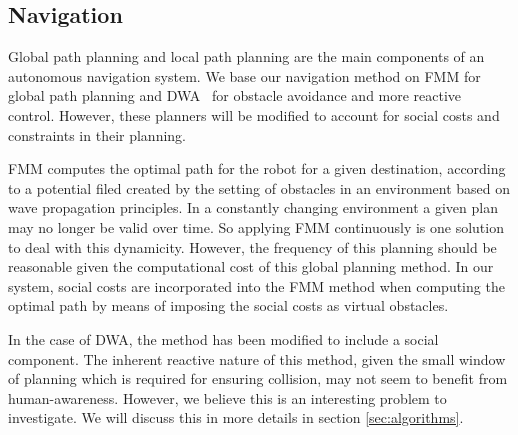  


\subsection*{Navigation}

Global path planning and local path planning are the main components of an autonomous navigation system.
We base our navigation method on FMM \cite{ventura2015} for global path planning and DWA~\cite{fox1997dynamic} for obstacle avoidance and more reactive control. However, these planners will be modified to account for social costs and constraints in their planning. 

FMM computes the optimal path for the robot for a given destination, according to a potential filed created by the setting of obstacles in an environment based on wave propagation principles. In a constantly changing environment a given plan may no longer be valid over time. So applying FMM continuously is one solution to deal with this dynamicity. However, the frequency of this planning should be reasonable given the computational cost of this global planning method. In our system, social costs are incorporated into the FMM method when computing the optimal path by means of imposing the social costs as virtual obstacles.

In the case of DWA, the method has been modified to include a social component. The inherent reactive nature of this method, given the small window of planning which is required for ensuring collision, may not seem to benefit from human-awareness. However, we believe this is an interesting problem to investigate. We will discuss this in more details in section \ref{sec:algorithms}. 




